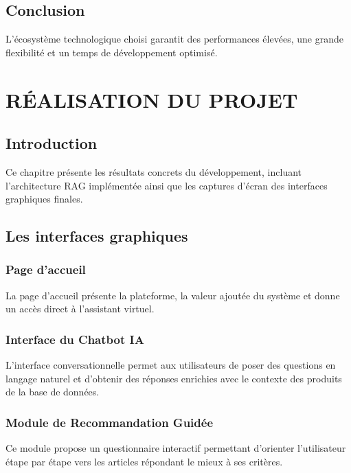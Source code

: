 \documentclass[12pt, a4paper, oneside]{report}
\begin{document}
\section{Conclusion}
L'écosystème technologique choisi garantit des performances élevées, une grande flexibilité et un temps de développement optimisé.

\chapter{RÉALISATION DU PROJET}

\section{Introduction}
Ce chapitre présente les résultats concrets du développement, incluant l'architecture RAG implémentée ainsi que les captures d'écran des interfaces graphiques finales.

\section{Les interfaces graphiques}

\subsection{Page d'accueil}
La page d'accueil présente la plateforme, la valeur ajoutée du système et donne un accès direct à l'assistant virtuel.

\subsection{Interface du Chatbot IA}
L'interface conversationnelle permet aux utilisateurs de poser des questions en langage naturel et d'obtenir des réponses enrichies avec le contexte des produits de la base de données.

\subsection{Module de Recommandation Guidée}
Ce module propose un questionnaire interactif permettant d'orienter l'utilisateur étape par étape vers les articles répondant le mieux à ses critères.
\end{document}
